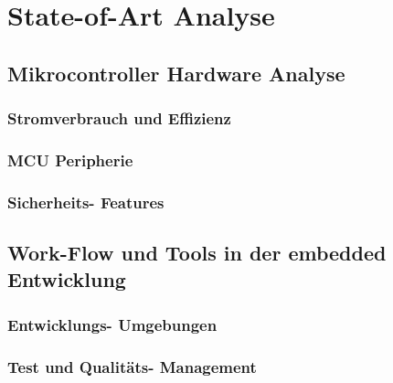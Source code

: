 \documentclass[MES,Master,ngerman]{twbook}%
\begin{document}
{{{    \newcommand{\citefigm}[2]{(Source: taken with modification from \protect\cite{#1}, p. #2)}%
    \newcommand{\citep}{\citeasnoun}%
    \newcommand{\acessedthrough}{Available at:}%
    \newcommand{\acessedthroughp}{Available through:}%
    \newcommand{\acessedat}{Accessed}%
    \newcommand{\singlepage}{p.}%
    \newcommand{\multiplepages}{pp.}%
    \newcommand{\chapternr}{Ch.}%
    \renewcommand{\harvardand}{\&}%
    \newcommand{\abstractonly}{Abstract only}
    \newcommand{\edition}{~edition}%
}}}

\maketitle


%
%
\chapter{State-of-Art Analyse}
\section{Mikrocontroller Hardware Analyse}
\subsection{Stromverbrauch und Effizienz}
\subsection{MCU Peripherie}
\subsection{Sicherheits- Features}
\section{Work-Flow und Tools in der embedded Entwicklung}
\subsection{Entwicklungs- Umgebungen}
\subsection{Test und Qualitäts- Management}
\end{document}
